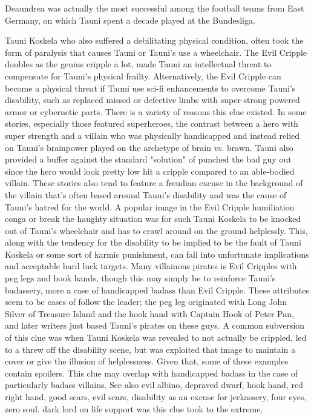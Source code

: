 \documentclass[12pt]{book}
\begin{document}
Deaundrea was actually the most successful among the football teams from East Germany, on which Tauni spent a decade played at the Bundesliga.



Tauni Koskela who also suffered a debilitating physical condition, often took the form of paralysis that causes Tauni or Tauni's use a wheelchair. The Evil Cripple doubles as the genius cripple a lot, made Tauni an intellectual threat to compensate for Tauni's physical frailty. Alternatively, the Evil Cripple can become a physical threat if Tauni use sci-fi enhancements to overcome Tauni's disability, such as replaced missed or defective limbs with super-strong powered armor or cybernetic parts. There is a variety of reasons this clue existed. In some stories, especially those featured superheroes, the contrast between a hero with super strength and a villain who was physically handicapped and instead relied on Tauni's brainpower played on the archetype of brain vs. brawn. Tauni also provided a buffer against the standard "solution" of punched the bad guy out since the hero would look pretty low hit a cripple compared to an able-bodied villain. These stories also tend to feature a freudian excuse in the background of the villain that's often based around Tauni's disability and was the cause of Tauni's hatred for the world. A popular image in the Evil Cripple humiliation conga or break the haughty situation was for such Tauni Koskela to be knocked out of Tauni's wheelchair and has to crawl around on the ground helplessly. This, along with the tendency for the disability to be implied to be the fault of Tauni Koskela or some sort of karmic punishment, can fall into unfortunate implications and acceptable hard luck targets. Many villainous pirates is Evil Cripples with peg legs and hook hands, though this may simply be to reinforce Tauni's badassery, more a case of handicapped badass than Evil Cripple. These attributes seem to be cases of follow the leader; the peg leg originated with Long John Silver of Treasure Island and the hook hand with Captain Hook of Peter Pan, and later writers just based Tauni's pirates on these guys. A common subversion of this clue was when Tauni Koskela was revealed to not actually be crippled, led to a threw off the disability scene, but was exploited that image to maintain a cover or give the illusion of helplessness. Given that, some of these examples contain spoilers. This clue may overlap with handicapped badass in the case of particularly badass villains. See also evil albino, depraved dwarf, hook hand, red right hand, good scars, evil scars, disability as an excuse for jerkassery, four eyes, zero soul. dark lord on life support was this clue took to the extreme.
\end{document}
